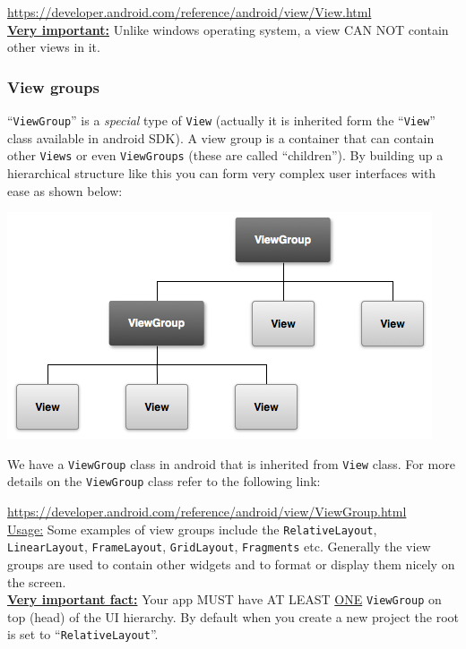 \url{https://developer.android.com/reference/android/view/View.html}\\

\underline{\textbf{Very important:}} Unlike windows operating system, a view CAN NOT contain other views in it.

\subsubsection{View groups}
``\texttt{ViewGroup}'' is a \textit{special} type of \texttt{View} (actually it is inherited form the ``\texttt{View}'' class available in android SDK). A view group is a container that can contain other \texttt{Views} or even \texttt{ViewGroups} (these are called ``children''). By building up a hierarchical structure like this you can form very complex user interfaces with ease as shown below:

\begin{center}
	\includegraphics[scale=0.4]{chapters/ch03/images/2_viewGroups}
\end{center}

We have a \texttt{ViewGroup} class in android that is inherited from \texttt{View} class. For more details on the \texttt{ViewGroup} class refer to the following link:

\url{https://developer.android.com/reference/android/view/ViewGroup.html} \\

\underline{Usage:} Some examples of view groups include the \texttt{RelativeLayout}, \texttt{LinearLayout}, \texttt{FrameLayout}, \texttt{GridLayout}, \texttt{Fragments} etc. Generally the view groups are used to contain other widgets and to format or display them nicely on the screen. \\

\underline{\textbf{Very important fact:}} Your app MUST have AT LEAST \underline{ONE} \texttt{ViewGroup} on top (head) of the UI hierarchy. By default when you create a new project the root is set to ``\texttt{RelativeLayout}''.\\

